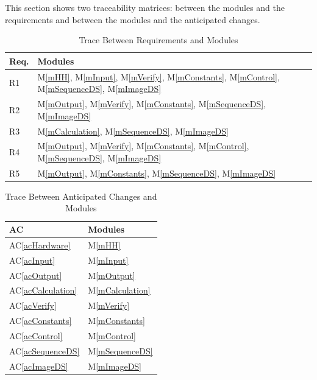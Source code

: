\documentclass[12pt, titlepage]{article}
\newcommand{\acref}[1]{AC\ref{#1}}
\newcommand{\mref}[1]{M\ref{#1}}
\begin{document}
This section shows two traceability matrices: between the modules and the
requirements and between the modules and the anticipated changes.

\begin{table}[H]
\centering
\begin{tabular}{p{} p{}}
\toprule
\textbf{Req.} & \textbf{Modules}\\
\midrule
R1 & \mref{mHH}, \mref{mInput}, \mref{mVerify}, \mref{mConstants},
\mref{mControl}, \mref{mSequenceDS}, \mref{mImageDS}\\
R2 & \mref{mOutput}, \mref{mVerify}, \mref{mConstants}, \mref{mSequenceDS},
\mref{mImageDS}\\
R3 & \mref{mCalculation}, \mref{mSequenceDS}, \mref{mImageDS}\\
R4 & \mref{mOutput}, \mref{mVerify}, \mref{mConstants}, \mref{mControl},
\mref{mSequenceDS}, \mref{mImageDS}\\
R5 & \mref{mOutput}, \mref{mConstants}, \mref{mSequenceDS}, \mref{mImageDS}\\
\bottomrule
\end{tabular}
\caption{Trace Between Requirements and Modules}
\label{TblRT}
\end{table}

\begin{table}[H]
\centering
\begin{tabular}{p{} p{}}
\toprule
\textbf{AC} & \textbf{Modules}\\
\midrule
\acref{acHardware} & \mref{mHH}\\
\acref{acInput} & \mref{mInput}\\
\acref{acOutput} & \mref{mOutput}\\
\acref{acCalculation} & \mref{mCalculation}\\
\acref{acVerify} & \mref{mVerify}\\
\acref{acConstants} & \mref{mConstants}\\
\acref{acControl} & \mref{mControl}\\
\acref{acSequenceDS} & \mref{mSequenceDS}\\
\acref{acImageDS} & \mref{mImageDS}\\
\bottomrule
\end{tabular}
\caption{Trace Between Anticipated Changes and Modules}
\label{TblACT}
\end{table}
\end{document}
